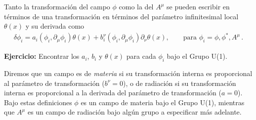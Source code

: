 Tanto la transformación del campo $\phi$ como la del $A^{\mu}$ se pueden escribir en términos de una transformación en términos del parámetro infinitesimal local $\theta(x)$ y su derivada como
\begin{align}
\label{eq:dfi}
  \delta\phi_i= a_{i}\left( \phi_{i},\partial_{\mu}\phi_{i} \right) \theta(x)+b^{\nu}_i \left( \phi_{i},\partial_{\mu}\phi_{i} \right) \partial_{\nu}\theta(x),\qquad \text{para $\phi_{i}=\phi,\phi^{*},A^{\mu}$}\,.
\end{align}

\textbf{Ejercicio:} Encontrar los $a_i$, $b_i$ y  $\theta(x)$ para cada $\phi_i$ bajo el Grupo U(1).

Diremos que un campo es de \emph{materia} si su transformación interna es proporcional al parámetro de transformación ($b^{\nu}=0$), o de radiación si su transformación interna es proporcional a la derivada del parámetro de transformación ($a=0$). Bajo estas definiciones $\phi$ es un campo de materia bajo el Grupo U(1), mientras que $A^{\mu}$ es un campo de radiación bajo algún grupo a especificar más adelante. 


